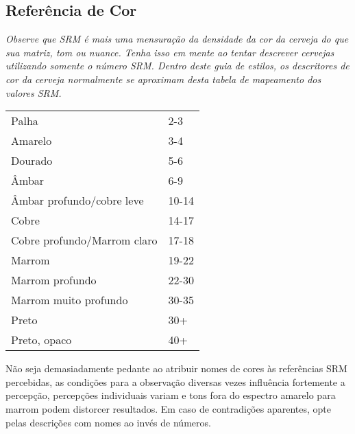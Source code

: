 \subsection*{Referência de Cor}
\textit{Observe que SRM é mais uma mensuração da densidade da cor da cerveja do que sua matriz, tom ou nuance. Tenha isso em mente ao tentar descrever cervejas utilizando somente o número SRM. Dentro deste guia de estilos, os descritores de cor da cerveja normalmente se aproximam desta tabela de mapeamento dos valores SRM.}

\begin{tabular}{ l l }
Palha & 2-3 \\
Amarelo & 3-4 \\
Dourado & 5-6 \\
Âmbar & 6-9 \\
Âmbar profundo/cobre leve & 10-14 \\
Cobre & 14-17 \\
Cobre profundo/Marrom claro & 17-18 \\
Marrom & 19-22 \\
Marrom profundo & 22-30 \\
Marrom muito profundo & 30-35 \\
Preto & 30+ \\
Preto, opaco & 40+
\end{tabular}

Não seja demasiadamente pedante ao atribuir nomes de cores às referências SRM percebidas, as condições para a observação diversas vezes influência fortemente a percepção, percepções individuais variam e tons fora do espectro amarelo para marrom podem distorcer resultados. Em caso de contradições aparentes, opte pelas descrições com nomes ao invés de números.
